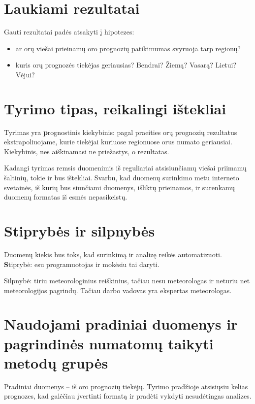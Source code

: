 \documentclass{article}
\begin{document}
\section{Laukiami rezultatai}

Gauti rezultatai padės atsakyti į hipotezes:
\begin{itemize}
    \item ar orų viešai prieinamų oro prognozių patikimumas svyruoja tarp
        regionų?
    \item kuris orų prognozės tiekėjas geriausias? Bendrai? Žiemą? Vasarą?
        Lietui? Vėjui?
\end{itemize}

\section{Tyrimo tipas, reikalingi ištekliai}

Tyrimas yra {\textbf prognostinis kiekybinis}: pagal praeities orų prognozių
rezultatus ekstrapoliuojame, kurie tiekėjai kuriuose regionuose orus numato
geriausiai. Kiekybinis, nes aiškinamasi ne priežastys, o rezultatas.

Kadangi tyrimas remsis duomenimis iš reguliariai atsisiunčiamų viešai priimamų
šaltinių, tokie ir bus ištekliai. Svarbu, kad duomenų surinkimo metu
interneto svetainės, iš kurių bus siunčiami duomenys, išliktų prieinamos, ir
surenkamų duomenų formatas iš esmės nepasikeistų.

\section{Stiprybės ir silpnybės}

Duomenų kiekis bus toks, kad surinkimą ir analizę reikės automatizuoti.
{\textbf Stiprybė}: esu programuotojas ir mokėsiu tai daryti.

Silpnybė: tiriu meteorologinius reiškinius, tačiau nesu meteorologas ir neturiu
net meteorologijos pagrindų. Tačiau darbo vadovas yra ekspertas meteorologas.

\section{Naudojami pradiniai duomenys ir pagrindinės numatomų taikyti metodų grupės}

Pradiniai duomenys -- iš oro prognozių tiekėjų. Tyrimo pradžioje atsisiųsiu
kelias prognozes, kad galėčiau įvertinti formatą ir pradėti vykdyti
nesudėtingas analizes.

\printbibliography
\end{document}
